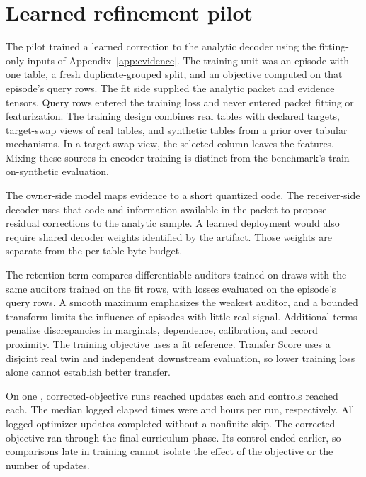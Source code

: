 \clearpage
\section{Learned refinement pilot}\label{app:training}

The pilot trained a learned correction to the analytic decoder using the fitting-only inputs of Appendix~\ref{app:evidence}. The training unit was an episode with one table, a fresh duplicate-grouped split, and an objective computed on that episode's query rows. The fit side supplied the analytic packet and evidence tensors. Query rows entered the training loss and never entered packet fitting or featurization. The training design combines real tables with declared targets, target-swap views of real tables, and synthetic tables from a prior over tabular mechanisms. In a target-swap view, the selected column leaves the features. Mixing these sources in encoder training is distinct from the benchmark's train-on-synthetic evaluation.

The owner-side model maps evidence to a short quantized code. The receiver-side decoder uses that code and information available in the packet to propose residual corrections to the analytic sample. A learned deployment would also require shared decoder weights identified by the artifact. Those weights are separate from the per-table byte budget.

The retention term compares differentiable auditors trained on draws with the same auditors trained on the fit rows, with losses evaluated on the episode's query rows. A smooth maximum emphasizes the weakest auditor, and a bounded transform limits the influence of episodes with little real signal. Additional terms penalize discrepancies in marginals, dependence, calibration, and record proximity. The training objective uses a fit reference. Transfer Score uses a disjoint real twin and independent downstream evaluation, so lower training loss alone cannot establish better transfer.

On one \TrainingGpu{},  corrected-objective runs reached  updates each and  controls reached  each.
The median logged elapsed times were  and  hours per run, respectively.
All  logged optimizer updates completed without a nonfinite skip. The corrected objective ran through the final curriculum phase. Its control ended earlier, so comparisons late in training cannot isolate the effect of the objective or the number of updates.


